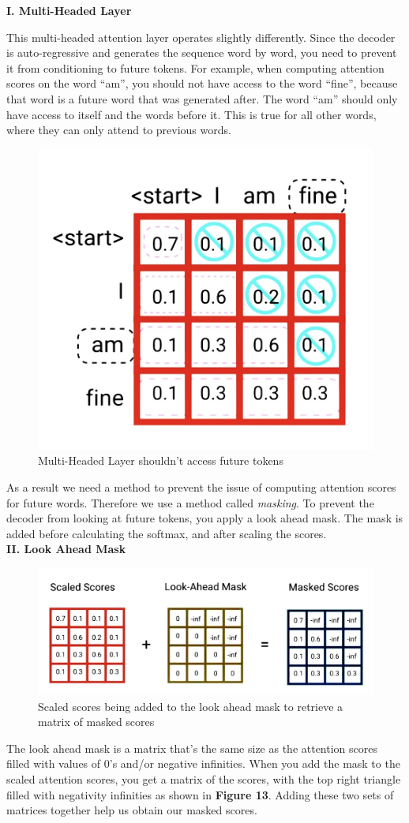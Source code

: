 \noindent
\textbf{I. Multi-Headed Layer}

This multi-headed attention layer operates slightly differently. Since the decoder is auto-regressive and generates the sequence word by word, you need to prevent it from conditioning to future tokens. For example, when computing attention scores on the word “am”, you should not have access to the word “fine”, because that word is a future word that was generated after. The word “am” should only have access to itself and the words before it. This is true for all other words, where they can only attend to previous words.

\begin{figure}[H]
\centering
\includegraphics[width=.3\textwidth]{figures/t12.jpg}
\caption{Multi-Headed Layer shouldn't access future tokens}
\end{figure}

As a result we need a method to prevent the issue of computing attention scores for future words. Therefore we use a method called \emph{masking}. To prevent the decoder from looking at future tokens, you apply a look ahead mask. The mask is added before calculating the softmax, and after scaling the scores. \\

\noindent
\textbf{II. Look Ahead Mask}

\begin{figure}[H]
\centering
\includegraphics[width=.55\textwidth]{figures/t13.jpg}
\caption{Scaled scores being added to the look ahead mask to retrieve a matrix of masked scores}
\end{figure}

The look ahead mask is a matrix that’s the same size as the attention scores filled with values of 0’s and/or negative infinities. When you add the mask to the scaled attention scores, you get a matrix of the scores, with the top right triangle filled with negativity infinities as shown in \textbf{Figure 13}. Adding these two sets of matrices together help us obtain our masked scores.

